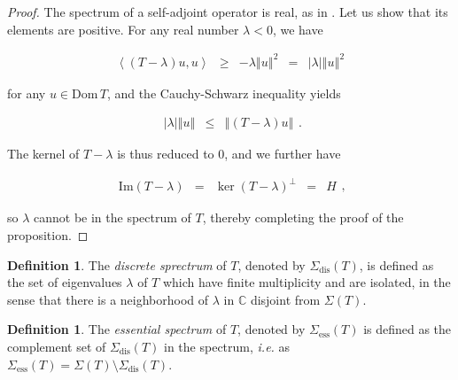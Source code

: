 \documentclass{jams-l}
\theoremstyle{definition}
\newtheorem{definition}[theorem]{Definition}
\theoremstyle{remark}
\numberwithin{equation}{section}
\begin{document}
        \begin{proof}
        
            The spectrum of a self-adjoint operator is real, as in \cite[Sec. 5.3.4]{MR1335452}. Let us show that its elements are positive. For any real number $\lambda < 0$, we have
            
            \[ \begin{array}{ccccc}
                    \left< \left( T - \lambda \right) u, u \right> & \geqslant & - \lambda \left \Vert u \right \Vert^2 & = & \left \vert \lambda \right \vert \left \Vert u \right \Vert^2
                \end{array} \]
            
            \noindent for any $u \in \mathrm{Dom} \, T$, and the Cauchy-Schwarz inequality yields
            
            \[ \begin{array}{ccc}
                    \left \vert \lambda \right \vert \left \Vert u \right \Vert & \leqslant & \left \Vert \left( T - \lambda \right) u \right \Vert
                \end{array} . \]
            
            \noindent The kernel of $T - \lambda$ is thus reduced to $0$, and we further have
            
            \[ \begin{array}{ccccc}
                    \mathrm{Im} \left( T - \lambda \right) & = & \ker \left( T - \lambda \right)^{\perp} & = & H
                \end{array} , \]
            
            \noindent so $\lambda$ cannot be in the spectrum of $T$, thereby completing the proof of the proposition.
        
        \end{proof}
        
        \begin{definition}
        
            The \textit{discrete sprectrum} of $T$, denoted by $\Sigma_{\mathrm{dis}} \left( T \right)$, is defined as the set of eigenvalues $\lambda$ of $T$ which have finite multiplicity and are isolated, in the sense that there is a neighborhood of $\lambda$ in $\mathbb{C}$ disjoint from $\Sigma \left( T \right)$.
        
        \end{definition}
        
        \begin{definition}
        
            The \textit{essential spectrum} of $T$, denoted by $\Sigma_{\mathrm{ess}} \left( T \right)$ is defined as the complement set of $\Sigma_{\mathrm{dis}} \left( T \right)$ in the spectrum, \textit{i.e.} as $\Sigma_{\mathrm{ess}} \left( T \right) = \Sigma \left( T \right) \setminus \Sigma_{\mathrm{dis}} \left( T \right)$.
        
        \end{definition}
        
\end{document}
